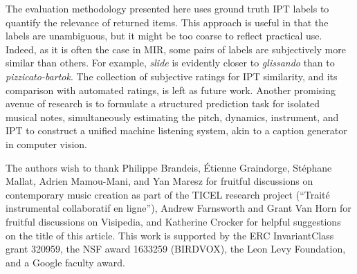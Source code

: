 The evaluation methodology presented here uses ground truth IPT labels to quantify the relevance of returned items.
This approach is useful in that the labels are unambiguous, but it might be too coarse to reflect practical use.
Indeed, as it is often the case in MIR, some pairs of labels are subjectively more similar than others.
For example, \emph{slide} is evidently closer to \emph{glissando} than to \emph{pizzicato-bartok}.
The collection of subjective ratings for IPT similarity, and its comparison with automated ratings, is left as future work.
Another promising avenue of research is to formulate a structured prediction task for isolated musical notes, simultaneously estimating the pitch, dynamics, instrument, and IPT to construct a unified machine listening system, akin to a caption generator in computer vision.



\begin{acks}
The authors wish to thank Philippe Brandeis, \'{E}tienne Graindorge, St\'{e}phane Mallat, Adrien Mamou-Mani, and Yan Maresz for fruitful discussions on contemporary music creation as part of the TICEL research project (``Trait\'{e} instrumental collaboratif en ligne''),
Andrew Farnsworth and Grant Van Horn for fruitful discussions on Visipedia,
and Katherine Crocker for helpful suggestions on the title of this article.
This work is supported by the ERC InvariantClass grant 320959, the NSF award 1633259 (BIRDVOX), the Leon Levy Foundation, and a Google faculty award.
\end{acks}
